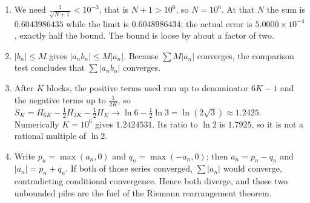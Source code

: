 \begin{enumerate}[label=\textbf{5.\arabic*}]
  \item We need $\frac{1}{\sqrt{N+1}}<10^{-3}$, that is $N+1>10^{6}$, so $N=10^{6}$.
        At that $N$ the sum is $0. 6043986435$ while the limit is
        $0. 6048986434$; the actual error is $5. 0000\times10^{-4}$, exactly half the
        bound. The bound is loose by about a factor of two.

  \item $|b_{n}|\le M$ gives $|a_{n}b_{n}|\le M|a_{n}|$. Because $\sum M|a_{n}|$
        converges, the comparison test concludes that $\sum|a_{n}b_{n}|$ converges.

  \item After $K$ blocks, the positive terms used run up to denominator $6K-1$ and the
        negative terms up to $\frac{1}{2K}$, so
        $S_{K}=H_{6K}-\frac12H_{3K}-\frac12H_{K}\to\ln6-\frac12\ln3=\ln(2\sqrt3)
        \approx1. 2425$. Numerically $K=10^{6}$ gives $1. 2424531$. Its ratio to
        $\ln2$ is $1. 7925$, so it is not a rational multiple of $\ln2$.

  \item Write $p_{n}=\max(a_{n},0)$ and $q_{n}=\max(-a_{n},0)$; then
        $a_{n}=p_{n}-q_{n}$ and $|a_{n}|=p_{n}+q_{n}$. If both of those series
        converged, $\sum|a_{n}|$ would converge, contradicting conditional
        convergence. Hence both diverge, and those two unbounded piles are the fuel
        of the Riemann rearrangement theorem.
\end{enumerate}
